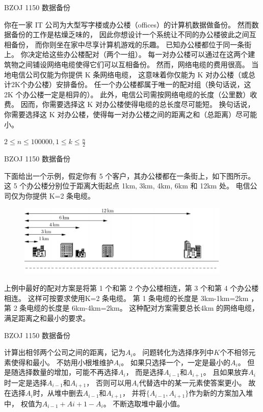 \documentclass{beamer}
\begin{document}
\begin{frame}{BZOJ 1150 数据备份}

    你在一家 IT 公司为大型写字楼或办公楼（offices）的计算机数据做备份。
    然而数据备份的工作是枯燥乏味的，
    因此你想设计一个系统让不同的办公楼彼此之间互相备份，
    而你则坐在家中尽享计算机游戏的乐趣。
    已知办公楼都位于同一条街上。
    你决定给这些办公楼配对（两个一组）。
    每一对办公楼可以通过在这两个建筑物之间铺设网络电缆使得它们可以互相备份。
    然而，网络电缆的费用很高。
    当地电信公司仅能为你提供 K 条网络电缆，
    这意味着你仅能为 K 对办公楼（或总计2K个办公楼）安排备份。
    任一个办公楼都属于唯一的配对组（换句话说，这 2K 个办公楼一定是相异的）。
    此外，电信公司需按网络电缆的长度（公里数）收费。
    因而，你需要选择这 K 对办公楼使得电缆的总长度尽可能短。
    换句话说，你需要选择这 K 对办公楼，使得每一对办公楼之间的距离之和（总距离）尽可能小。
    
    $2\leq n\leq 100000, 1\leq k\leq \frac{n}{2}$ 

\end{frame}

\begin{frame}{BZOJ 1150 数据备份}

    下面给出一个示例，假定你有 5 个客户，其办公楼都在一条街上，如下图所示。
    这 5 个办公楼分别位于距离大街起点 1km, 3km, 4km, 6km 和 12km 处。
    电信公司仅为你提供 K=2 条电缆。

    \begin{figure}
        \centering
        \includegraphics[width=0.9\textwidth]{bzoj1150.png}
    \end{figure}

    上例中最好的配对方案是将第 1 个和第 2 个办公楼相连，第 3 个和第 4 个办公楼相连。
    这样可按要求使用K=2 条电缆。
    第 1 条电缆的长度是 3km-1km=2km ，
    第 2 条电缆的长度是 6km-4km=2km。
    这种配对方案需要总长4km 的网络电缆，满足距离之和最小的要求。

\end{frame}

\begin{frame}{BZOJ 1150 数据备份}
    
    计算出相邻两个公司之间的距离，记为$A_i$。
    问题转化为选择序列中$K$个不相邻元素使得和最小。
    不妨用小根堆维护$A_i$。
    如果只选择一个，一定是最小的$A_i$。
    但是随选择数量的增加，可能不再选择$A_i$，
    而是选择$A_{i-1}$和$A_{i+1}$。
    且如果放弃$A_i$时一定是选择$A_{i-1}$和$A_{i+1}$，
    否则可以用$A_i$代替选中的某一元素使答案更小。
    故在选择$A_i$时，从堆中删去$A_{i-1}$和$A_{i+1}$，
    并将$\{A_{i-1},A_{i+1}\}$作为新的方案加入堆中，
    权值为$A_{i-1}+A{i+1}-A_i$。
    不断选取堆中最小值。

\end{frame}
\end{document}

